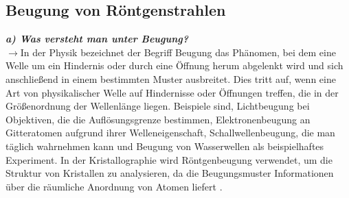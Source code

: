 \subsection{\label{subsec:FZV5}Beugung von Röntgenstrahlen}
\textbf{\textit{a) Was versteht man unter Beugung?}}\\
$\rightarrow$In der Physik bezeichnet der Begriff Beugung das Phänomen, bei dem eine Welle um ein Hindernis oder 
durch eine Öffnung herum abgelenkt wird und sich anschließend in einem bestimmten Muster ausbreitet. 
Dies tritt auf, wenn eine Art von physikalischer Welle auf Hindernisse oder Öffnungen treffen, die in der Größenordnung der Wellenlänge liegen.
Beispiele sind, Lichtbeugung bei Objektiven, die die Auflösungsgrenze bestimmen, Elektronenbeugung an Gitteratomen aufgrund ihrer Welleneigenschaft, 
Schallwellenbeugung, die man täglich wahrnehmen kann und Beugung von Wasserwellen als beispielhaftes Experiment. 
In der Kristallographie wird Röntgenbeugung verwendet, um die Struktur von Kristallen zu analysieren, da die Beugungsmuster Informationen über die 
räumliche Anordnung von Atomen liefert \cite{Schwarz, Kristall}. \\

